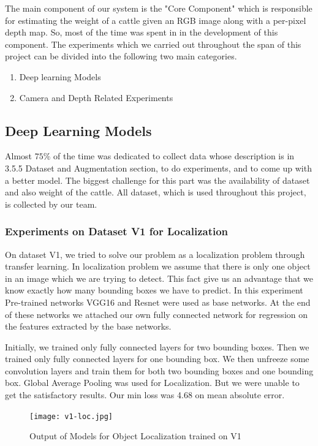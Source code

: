 The main component of our system is the "Core Component" which is responsible for estimating the weight of a cattle given an RGB image along with a per-pixel depth map. So, most of the time was spent in in the development of this component. The experiments which we carried out throughout the span of this project can be divided into the following two main categories.
\begin{enumerate}
\item Deep learning Models 
\item Camera and Depth Related Experiments 
\end{enumerate}
\subsection{Deep Learning Models}
Almost \(75\%\) of the time was dedicated to collect data whose description is in 3.5.5 Dataset and Augmentation section, to do experiments, and to come up with a better model. The biggest challenge for this part was the availability of dataset and also weight of the cattle. All dataset, which is used throughout this project, is collected by our team. 
\\

\subsubsection{Experiments on Dataset V1 for Localization}

On dataset V1, we tried to solve our problem as a localization problem through transfer learning. In localization problem we assume that there is only one object in an image which we are trying to detect. This fact give us an advantage that we know exactly how many bounding boxes we have to predict. In this experiment Pre-trained networks VGG16 and Resnet were used as base networks. At the end of these networks we attached our own fully connected network for regression on the features extracted by the base networks. 

Initially, we trained only fully connected layers for two bounding boxes. Then we trained only fully connected layers for one bounding box. We then unfreeze some convolution layers and train them for both two bounding boxes and one bounding box. Global Average Pooling was used for Localization. But we were unable to get the satisfactory results. Our min loss was 4.68 on mean absolute error. 

\begin{figure}[h]
\centering
\texttt{[image: v1-loc.jpg]}
\caption{Output of Models for Object Localization trained on V1}
\end{figure}


